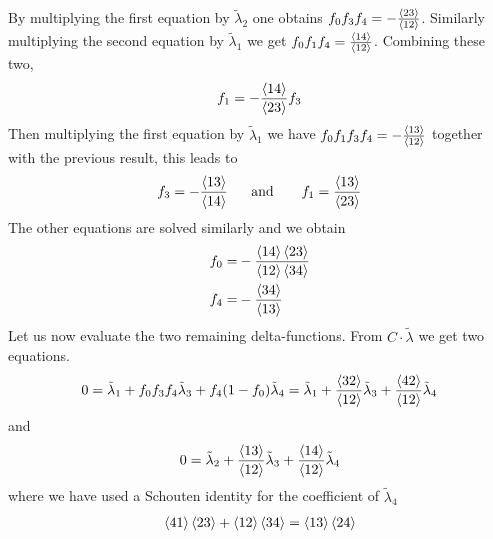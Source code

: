 \documentclass[a4paper,12pt]{article}
\begin{document}
By multiplying the first equation by $\tilde \lambda_2$ one obtains $f_0f_3f_4=-\frac{\expval{23}}{\expval{12}}$. Similarly multiplying the second equation by $\tilde \lambda_1$ we get $f_0f_1f_4= \frac{\expval{14}}{\expval{12}}$. Combining these two,
\begin{equation}
	\begin{aligned}
		f_1=-\frac{\expval{14}}{\expval{23}}f_3
	\end{aligned}
\end{equation}
Then multiplying the first equation by $\tilde\lambda_1$ we have $f_0f_1f_3f_4=-\frac{\expval{13}}{\expval{12}}$ together with the previous result, this leads to
\begin{equation}
	\begin{aligned}
		f_3 =-\frac{\expval{13}}{\expval{14}} ~~~~~\text{and }~~~~~f_1 =\frac{\expval{13}}{\expval{23}} 
	\end{aligned}
\end{equation}
The other equations are solved similarly and we obtain
\begin{equation}
	\begin{aligned}
		f_0=&-\frac{\expval{14}\expval{23}}{\expval{12}\expval{34}}\\
		f_4=&-\frac{\expval{34}}{\expval{13}} 
	\end{aligned}
\end{equation}
Let us now evaluate the two remaining delta-functions. From $C\cdot \tilde \lambda$ we get two equations. 
\begin{equation}
	\begin{aligned}
		0=\tilde\lambda_1+f_0f_3f_4 \tilde\lambda_3+f_4(1-f_0)\tilde\lambda_4=\tilde\lambda_1+\frac{\expval{32}}{\expval{12}} \tilde\lambda_3+\frac{\expval{42}}{\expval{12}} \tilde\lambda_4
	\end{aligned}
\end{equation}
and
\begin{equation}
	\begin{aligned}
		0=\tilde\lambda_2+\frac{\expval{13}}{\expval{12}} \tilde\lambda_3+\frac{\expval{14}}{\expval{12}} \tilde\lambda_4
	\end{aligned}
\end{equation}
where we have used a Schouten identity for the coefficient of $\tilde\lambda_4$
\begin{equation}
	\begin{aligned}
		\expval{41}\expval{23}+\expval{12}\expval{34}=\expval{13}\expval{24}
	\end{aligned}
\end{equation}
\end{document}
